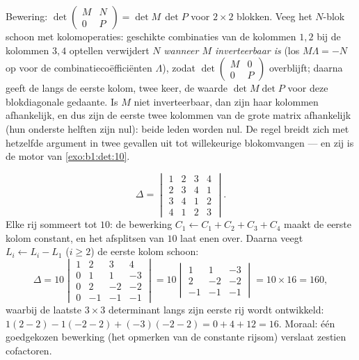\begin{example}
\label{ex:b1:det:blocktriangular}
Bewering: $\det\begin{pmatrix} M & N\\ 0 & P\end{pmatrix} = \det
M\,\det P$ voor $2\times2$ blokken. Veeg het $N$-blok schoon met
kolomoperaties: geschikte combinaties van de kolommen $1, 2$ bij de
kolommen $3, 4$ optellen verwijdert $N$ \emph{wanneer $M$
inverteerbaar is} (los $M\Lambda = -N$ op voor de
combinatiecoëfficiënten $\Lambda$), zodat $\det\begin{pmatrix} M &
0\\ 0 & P\end{pmatrix}$ overblijft; daarna geeft de
 langs de eerste kolom, twee keer, de waarde
$\det M\det P$ voor deze blokdiagonale gedaante. Is $M$ niet
inverteerbaar, dan zijn haar kolommen afhankelijk, en dus zijn de
eerste twee kolommen van de grote matrix afhankelijk (hun onderste
helften zijn nul): beide leden worden nul. De regel breidt zich met
hetzelfde argument in twee gevallen uit tot willekeurige
blokomvangen --- en zij is de motor van \cref{exo:b1:det:10}.
\end{example}

\begin{example}
\label{ex:b1:det:fourbyfour}
\[
\Delta = \begin{vmatrix}
1 & 2 & 3 & 4\\
2 & 3 & 4 & 1\\
3 & 4 & 1 & 2\\
4 & 1 & 2 & 3
\end{vmatrix}.
\]
Elke rij sommeert tot $10$: de bewerking $C_1 \leftarrow C_1 + C_2
+ C_3 + C_4$ maakt de eerste kolom constant, en het afsplitsen van
$10$ laat enen over. Daarna veegt $L_i \leftarrow L_i - L_1$ ($i
\geq 2$) de eerste kolom schoon:
\[
\Delta = 10\begin{vmatrix}
1 & 2 & 3 & 4\\
0 & 1 & 1 & -3\\
0 & 2 & -2 & -2\\
0 & -1 & -1 & -1
\end{vmatrix}
= 10\begin{vmatrix}
1 & 1 & -3\\
2 & -2 & -2\\
-1 & -1 & -1
\end{vmatrix}
= 10 \times 16 = 160,
\]
waarbij de laatste $3\times3$ determinant langs zijn eerste rij
wordt ontwikkeld: $1(2 - 2) - 1(-2 - 2) + (-3)(-2 - 2) = 0 + 4 + 12
= 16$. Moraal: één goedgekozen bewerking (het opmerken van de
constante rijsom) verslaat zestien cofactoren.
\end{example}

